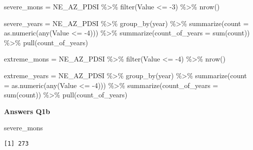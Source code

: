 \documentclass[
  letterpaper,
  DIV=11,
  numbers=noendperiod]{scrartcl}
\newenvironment{Shaded}{\begin{snugshade}}{\end{snugshade}}
\newcommand{\AttributeTok}[1]{\textcolor[rgb]{0.40,0.45,0.13}{#1}}
\newcommand{\DecValTok}[1]{\textcolor[rgb]{0.68,0.00,0.00}{#1}}
\newcommand{\FunctionTok}[1]{\textcolor[rgb]{0.28,0.35,0.67}{#1}}
\newcommand{\NormalTok}[1]{\textcolor[rgb]{0.00,0.23,0.31}{#1}}
\newcommand{\OtherTok}[1]{\textcolor[rgb]{0.00,0.23,0.31}{#1}}
\newcommand{\SpecialCharTok}[1]{\textcolor[rgb]{0.37,0.37,0.37}{#1}}
\begin{document}
\begin{Shaded}
\begin{Highlighting}[]
\NormalTok{severe\_mons }\OtherTok{=}\NormalTok{ NE\_AZ\_PDSI }\SpecialCharTok{\%\textgreater{}\%} 
  \FunctionTok{filter}\NormalTok{(Value }\SpecialCharTok{\textless{}=} \SpecialCharTok{{-}}\DecValTok{3}\NormalTok{) }\SpecialCharTok{\%\textgreater{}\%}
  \FunctionTok{nrow}\NormalTok{()}

\NormalTok{severe\_years }\OtherTok{=}\NormalTok{ NE\_AZ\_PDSI }\SpecialCharTok{\%\textgreater{}\%} 
  \FunctionTok{group\_by}\NormalTok{(year) }\SpecialCharTok{\%\textgreater{}\%}
  \FunctionTok{summarize}\NormalTok{(}\AttributeTok{count =} \FunctionTok{as.numeric}\NormalTok{(}\FunctionTok{any}\NormalTok{(Value }\SpecialCharTok{\textless{}=} \SpecialCharTok{{-}}\DecValTok{4}\NormalTok{))) }\SpecialCharTok{\%\textgreater{}\%}
  \FunctionTok{summarize}\NormalTok{(}\AttributeTok{count\_of\_years =} \FunctionTok{sum}\NormalTok{(count)) }\SpecialCharTok{\%\textgreater{}\%} 
  \FunctionTok{pull}\NormalTok{(count\_of\_years)}


\NormalTok{extreme\_mons }\OtherTok{=}\NormalTok{ NE\_AZ\_PDSI }\SpecialCharTok{\%\textgreater{}\%} 
  \FunctionTok{filter}\NormalTok{(Value }\SpecialCharTok{\textless{}=} \SpecialCharTok{{-}}\DecValTok{4}\NormalTok{) }\SpecialCharTok{\%\textgreater{}\%}
  \FunctionTok{nrow}\NormalTok{()}

\NormalTok{extreme\_years }\OtherTok{=}\NormalTok{ NE\_AZ\_PDSI }\SpecialCharTok{\%\textgreater{}\%} 
  \FunctionTok{group\_by}\NormalTok{(year) }\SpecialCharTok{\%\textgreater{}\%}
  \FunctionTok{summarize}\NormalTok{(}\AttributeTok{count =} \FunctionTok{as.numeric}\NormalTok{(}\FunctionTok{any}\NormalTok{(Value }\SpecialCharTok{\textless{}=} \SpecialCharTok{{-}}\DecValTok{4}\NormalTok{))) }\SpecialCharTok{\%\textgreater{}\%}
  \FunctionTok{summarize}\NormalTok{(}\AttributeTok{count\_of\_years =} \FunctionTok{sum}\NormalTok{(count)) }\SpecialCharTok{\%\textgreater{}\%} 
  \FunctionTok{pull}\NormalTok{(count\_of\_years)}
\end{Highlighting}
\end{Shaded}

\textbf{Answers Q1b}

\begin{Shaded}
\begin{Highlighting}[]
\NormalTok{severe\_mons}
\end{Highlighting}
\end{Shaded}

\begin{verbatim}
[1] 273
\end{verbatim}
\end{document}
